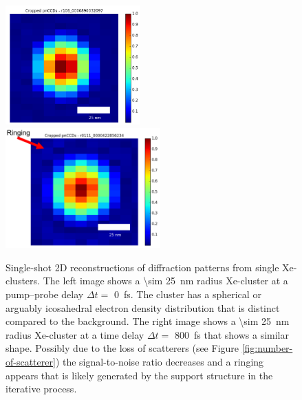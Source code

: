 %
%
%
\begin{figure}
	\centering
		\includegraphics[width=0.46\textwidth]{images/results/Xe_0_fs.png}
		\includegraphics[width=0.53\textwidth]{images/results/Xe_800_fs_ringing.png}
	\caption[Single-shot 2D reconstructions of \SI{\sim 25}{\nano\meter} radius Xe-clusters.]{Single-shot 2D reconstructions of diffraction patterns from single Xe-clusters. The left image shows a \SI{\sim 25}{\nano\meter} radius Xe-cluster at a pump--probe delay $\Delta t=$ \SI{0}{\femto\second}. The cluster has a spherical or arguably icosahedral electron density distribution that is distinct compared to the background. The right image shows a \SI{\sim 25}{\nano\meter} radius Xe-cluster at a time delay $\Delta t=$ \SI{800}{\femto\second} that shows a similar shape. Possibly due to the loss of scatterers (see Figure \ref{fig:number-of-scatterer}) the signal-to-noise ratio decreases and a ringing appears that is likely generated by the support structure in the iterative process.}
	\label{fig:Xe-2D-reconstructions}
\end{figure}
